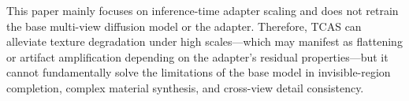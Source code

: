 \documentclass[times,twocolumn,final]{elsarticle}
\providecommand{\DIFdel}[1]{{\protect\color{red} \scriptsize #1}} %
\providecommand{\DIFdelbegin}{} %
\begin{document}
\DIFdelbegin %


\DIFdel{This paper mainly focuses on inference-time adapter scaling and does not retrain the base multi-view diffusion model or the adapter. Therefore, TCAS can alleviate texture degradation under high scales---which may manifest as flattening or artifact amplification depending on the adapter's residual properties---but it cannot fundamentally solve the limitations of the base model in invisible-region completion, complex material synthesis, and cross-view detail consistency. }%
\end{document}
